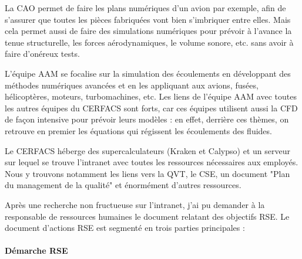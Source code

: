 
La \ac{CAO} permet de faire les plans numériques d'un avion par exemple, afin de s'assurer que toutes les pièces fabriquées vont bien s'imbriquer entre elles. Mais cela permet aussi de faire des simulations numériques pour prévoir à l'avance la tenue structurelle, les forces aérodynamiques, le volume sonore, etc. sans avoir à faire d'onéreux tests.

L'équipe AAM se focalise sur la simulation des écoulements en développant des méthodes numériques avancées et en les appliquant aux avions, fusées, hélicoptères, moteurs, turbomachines, etc. Les liens de l’équipe AAM avec toutes les autres équipes du CERFACS sont forts, car ces équipes utilisent aussi la \ac{CFD} de façon intensive pour prévoir leurs modèles : en effet, derrière ces thèmes, on retrouve en premier les équations qui régissent les écoulements des fluides.

\hspace{0,5cm}

Le CERFACS héberge des supercalculateurs (Kraken et Calypso) et un serveur sur lequel se trouve l'intranet avec toutes les ressources nécessaires aux employés.
Nous y trouvons notamment les liens vers la \ac{QVT}, le \ac{CSE}, un document "Plan du management de la qualité" et énormément d'autres ressources.







\newpage

Après une recherche non fructueuse sur l'intranet, j'ai pu demander à la responsable de ressources humaines le document relatant des objectifs \ac{RSE}. Le document d'actions RSE est segmenté en trois parties principales :

\paragraph{Démarche RSE}


